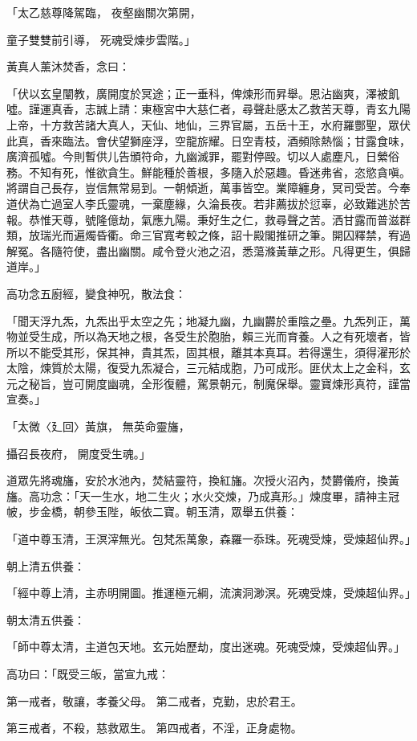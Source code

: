 \begin{showcontents}{}
「太乙慈尊降駕臨，  夜壑幽關次第開，

童子雙雙前引導，  死魂受煉步雲階。」

黃真人薰沐焚香，念曰：

「伏以玄皇闡教，廣開度於冥途；正一垂科，俾煉形而昇舉。恩沾幽爽，澤被飢噓。謹運真香，志誠上請：東極宮中大慈仁者，尋聲赴感太乙救苦天尊，青玄九陽上帝，十方救苦諸大真人，天仙、地仙，三界官屬，五岳十王，水府羅酆聖，眾伏此真，香來臨法。會伏望獅座浮，空龍旂耀。日空青枝，酒頻除熱惱；甘露食味，廣濟孤噓。今則暫供儿告頒符命，九幽滅罪，罷對停毆。切以人處塵凡，日縈俗務。不知有死，惟欲貪生。鮮能種於善根，多隨入於惡趣。昏迷弗省，恣慾貪嗔。將謂自己長存，豈信無常易到。一朝傾逝，萬事皆空。業障纏身，冥司受苦。今奉道伏為亡過室人李氏靈魂，一棄塵緣，久淪長夜。若非薦拔於愆辜，必致難逃於苦報。恭惟天尊，號隆億劫，氣應九陽。秉好生之仁，救尋聲之苦。洒甘露而普滋群類，放瑞光而遍燭昏衢。命三官寬考較之條，詔十殿閣推研之筆。開囚釋禁，宥過解冤。各隨符使，盡出幽關。咸令登火池之沼，悉蕩滌黃華之形。凡得更生，俱歸道岸。」

高功念五廚經，變食神呪，散法食：

「聞天浮九炁，九炁出乎太空之先；地凝九幽，九幽欝於重陰之壘。九炁列正，萬物並受生成，所以為天地之根，各受生於胞胎，賴三光而育養。人之有死壞者，皆所以不能受其形，保其神，貴其炁，固其根，離其本真耳。若得還生，須得濯形於太陰，煉質於太陽，復受九炁凝合，三元結成胞，乃可成形。匪伏太上之金科，玄元之秘旨，豈可開度幽魂，全形復體，駕景朝元，制魔保舉。靈寶煉形真符，謹當宣奏。」

「太微〈廴回〉黃旗，  無英命靈旛，

攝召長夜府，  開度受生魂。」

道眾先將魂旛，安於水池內，焚結靈符，換紅旛。次授火沼內，焚欝儀府，換黃旛。高功念：「天一生水，地二生火；水火交煉，乃成真形。」煉度畢，請神主冠帔，步金橋，朝參玉陛，皈依二寶。朝玉清，眾舉五供養：

「道中尊玉清，王溟滓無光。包梵炁萬象，森羅一忝珠。死魂受煉，受煉超仙界。」

朝上清五供養：

「經中尊上清，主赤明開圖。推運極元綱，流演洞渺溟。死魂受煉，受煉超仙界。」

朝太清五供養：

「師中尊太清，主道包天地。玄元始歷劫，度出迷魂。死魂受煉，受煉超仙界。」

高功曰：「既受三皈，當宣九戒：

第一戒者，敬讓，孝養父母。  第二戒者，克勤，忠於君王。

第三戒者，不殺，慈救眾生。  第四戒者，不淫，正身處物。


\end{showcontents}
